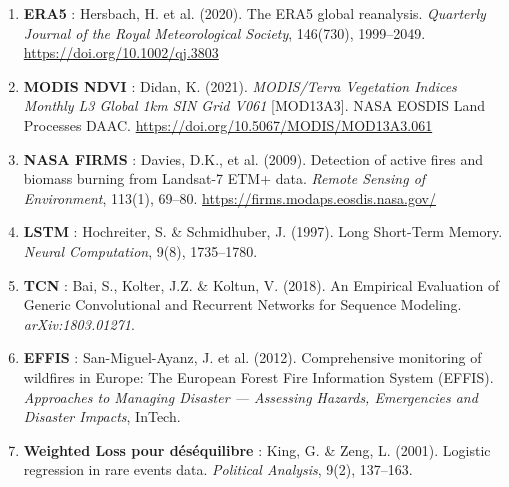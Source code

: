 \documentclass[12pt,a4paper]{report}
\begin{document}
\begin{enumerate}[leftmargin=*]
  \item \textbf{ERA5} : Hersbach, H. et al. (2020). The ERA5 global reanalysis.
    \textit{Quarterly Journal of the Royal Meteorological Society}, 146(730),
    1999–2049. \url{https://doi.org/10.1002/qj.3803}

  \item \textbf{MODIS NDVI} : Didan, K. (2021). \textit{MODIS/Terra Vegetation
    Indices Monthly L3 Global 1km SIN Grid V061} [MOD13A3]. NASA EOSDIS Land
    Processes DAAC. \url{https://doi.org/10.5067/MODIS/MOD13A3.061}

  \item \textbf{NASA FIRMS} : Davies, D.K., et al. (2009). Detection of active
    fires and biomass burning from Landsat-7 ETM+ data. \textit{Remote Sensing
    of Environment}, 113(1), 69–80.
    \url{https://firms.modaps.eosdis.nasa.gov/}

  \item \textbf{LSTM} : Hochreiter, S. \& Schmidhuber, J. (1997). Long Short-Term
    Memory. \textit{Neural Computation}, 9(8), 1735–1780.

  \item \textbf{TCN} : Bai, S., Kolter, J.Z. \& Koltun, V. (2018). An Empirical
    Evaluation of Generic Convolutional and Recurrent Networks for Sequence
    Modeling. \textit{arXiv:1803.01271}.

  \item \textbf{EFFIS} : San-Miguel-Ayanz, J. et al. (2012). Comprehensive
    monitoring of wildfires in Europe: The European Forest Fire Information System
    (EFFIS). \textit{Approaches to Managing Disaster — Assessing Hazards,
    Emergencies and Disaster Impacts}, InTech.

  \item \textbf{Weighted Loss pour déséquilibre} : King, G. \& Zeng, L. (2001).
    Logistic regression in rare events data.
    \textit{Political Analysis}, 9(2), 137–163.
\end{enumerate}
\end{document}
